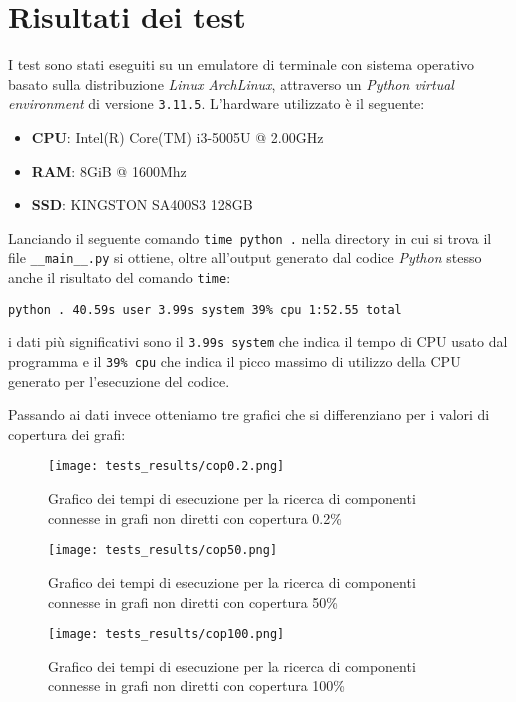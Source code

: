 \section{Risultati dei test}

I test sono stati eseguiti su un emulatore di terminale con sistema operativo basato sulla distribuzione \textit{Linux} \textit{ArchLinux},
attraverso un \textit{Python virtual environment} di versione \texttt{3.11.5}. L'hardware utilizzato è il seguente:
\begin{itemize}
    \item \textbf{CPU}: Intel(R) Core(TM) i3-5005U @ 2.00GHz
    \item \textbf{RAM}: 8GiB @ 1600Mhz
    \item \textbf{SSD}: KINGSTON SA400S3 128GB
\end{itemize}

Lanciando il seguente comando \texttt{time python .} nella directory in cui si trova il file \texttt{\_\_main\_\_.py} si ottiene,
oltre all'output generato dal codice \textit{Python} stesso anche il risultato del comando \texttt{time}:
\begin{center}
    \texttt{python .  40.59s user 3.99s system 39\% cpu 1:52.55 total}
\end{center}
i dati più significativi sono il \texttt{3.99s system} che indica il tempo di CPU usato dal programma e il \texttt{39\% cpu} che indica
il picco massimo di utilizzo della CPU generato per l'esecuzione del codice.\newline

Passando ai dati invece otteniamo tre grafici che si differenziano per i valori di copertura dei grafi:

\begin{figure}
    \centering
    \captionsetup{justification=centering}
    \texttt{[image: tests\_results/cop0.2.png]}
    \caption{Grafico dei tempi di esecuzione per la ricerca di componenti connesse in grafi non diretti con copertura 0.2\%}
\end{figure}


\begin{figure}
    \centering
    \captionsetup{justification=centering}
    \texttt{[image: tests\_results/cop50.png]}
    \caption{Grafico dei tempi di esecuzione per la ricerca di componenti connesse in grafi non diretti con copertura 50\%}
\end{figure}


\begin{figure}
    \centering
    \captionsetup{justification=centering}
    \texttt{[image: tests\_results/cop100.png]}
    \caption{Grafico dei tempi di esecuzione per la ricerca di componenti connesse in grafi non diretti con copertura 100\%}
\end{figure}
